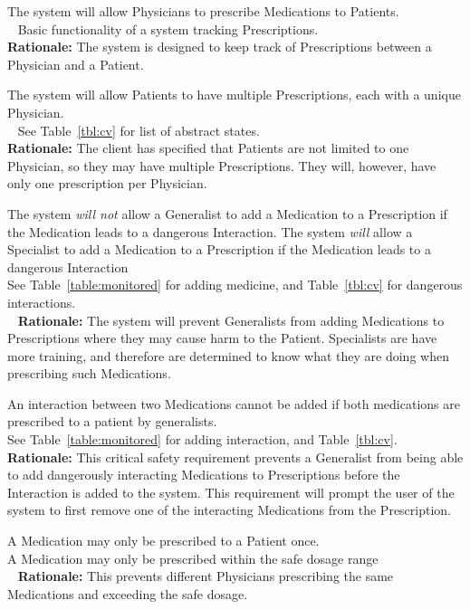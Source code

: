 {The system will allow Physicians to prescribe Medications to Patients.\\~}
{ Basic functionality of a system tracking Prescriptions. \\}
\label{R5}
\textbf{Rationale:} The system is designed to keep track of Prescriptions between a Physician and a Patient.

{The system will allow Patients to have multiple Prescriptions, each with a unique Physician.\\~}
{ See Table~\ref{tbl:cv} for list of abstract states.\\}
\label{R6}
\textbf{Rationale:} The client has specified that Patients are not limited to one Physician, so they may have multiple Prescriptions. They will, however, have only one prescription per Physician.

{The system \textit{will not} allow a Generalist to add a Medication to a Prescription if the Medication leads to a dangerous Interaction. The system \textit{will} allow a Specialist to add a Medication to a Prescription if the Medication leads to a dangerous Interaction\\}
{ See Table~\ref{table:monitored} for adding medicine, and Table~\ref{tbl:cv} for dangerous interactions.\\~}
\label{R7}
\textbf{Rationale:} The system will prevent Generalists from adding Medications to Prescriptions where they may cause harm to the Patient. Specialists are  have more training, and therefore are determined to know what they are doing when prescribing such Medications.

{An interaction between two Medications cannot be added if both medications are prescribed to a patient
by generalists.\\}
{ See Table~\ref{table:monitored} for adding interaction, and Table~\ref{tbl:cv}.\\}
\label{R8}
\textbf{Rationale:} This critical safety requirement prevents a Generalist from being able to add dangerously interacting Medications to Prescriptions before the Interaction is added to the system. This requirement will prompt the user of the system to first remove one of the interacting Medications from the Prescription.

{A Medication may only be prescribed to a Patient once. \\}
{ A Medication may only be prescribed within the safe dosage range \\~}
\label{R9}
\textbf{Rationale:} This prevents different Physicians prescribing the same Medications and exceeding the safe dosage.

